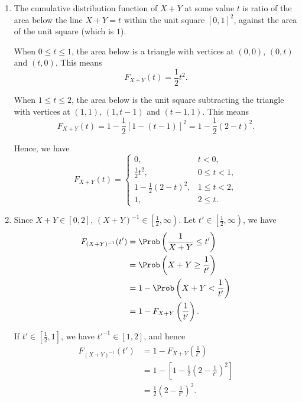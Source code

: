 \Question{\currfilebase}

\begin{enumerate}
    \item The cumulative distribution function of \(X + Y\) at some value \(t\) is ratio of the area below the line \(X + Y = t\) within the unit square \([0, 1]^2\), against the area of the unit square (which is \(1\)).

          When \(0 \leq t \leq 1\), the area below is a triangle with vertices at \((0, 0)\), \((0, t)\) and \((t, 0)\). This means
          \[
              F_{X + Y}(t) = \frac{1}{2}t^2.
          \]

          When \(1 \leq t \leq 2\), the area below is the unit square subtracting the triangle with vertices at \((1, 1)\), \((1, t - 1)\) and \((t - 1, 1)\). This means
          \[
              F_{X + Y}(t) = 1 - \frac{1}{2}[1 - (t - 1)]^2 = 1 - \frac{1}{2} (2 - t)^2.
          \]

          Hence, we have
          \[
              F_{X + Y}(t) =
              \begin{cases}
                  0,                         & t < 0,        \\
                  \frac{1}{2} t^2,           & 0 \leq t < 1, \\
                  1 - \frac{1}{2} (2 - t)^2, & 1 \leq t < 2, \\
                  1,                         & 2 \leq t.
              \end{cases}
          \]

    \item Since \(X + Y \in [0, 2]\), \((X + Y)^{-1} \in \left[\frac{1}{2}, \infty\right)\). Let \(t' \in \left[\frac{1}{2}, \infty\right)\), we have
          \begin{align*}
              F_{(X + Y)^{-1}}(t') & = \Prob\left(\frac{1}{X + Y} \leq t'\right)  \\
                                   & = \Prob\left(X + Y \geq \frac{1}{t'}\right)  \\
                                   & = 1 - \Prob\left(X + Y < \frac{1}{t'}\right) \\
                                   & = 1 - F_{X + Y}\left(\frac{1}{t'}\right).
          \end{align*}

          If \(t' \in \left[\frac{1}{2}, 1\right]\), we have \(t'^{-1} \in [1, 2]\), and hence
          \begin{align*}
              F_{(X + Y)^{-1}}(t') & = 1 - F_{X + Y}\left(\frac{1}{t'}\right)                           \\
                                   & = 1 - \left[1 - \frac{1}{2} \left(2 - \frac{1}{t'}\right)^2\right] \\
                                   & = \frac{1}{2} \left(2 - \frac{1}{t'}\right)^2.
          \end{align*}


\end{enumerate}

